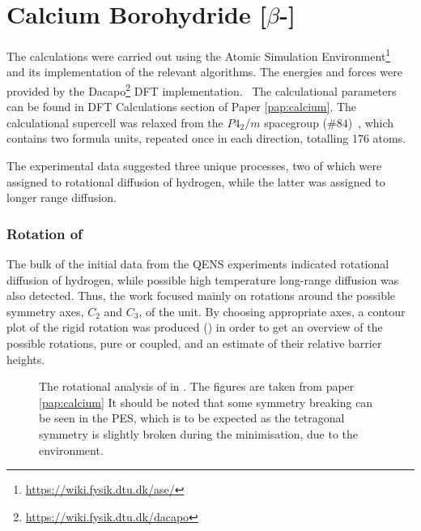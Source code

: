 \section{Calcium Borohydride [$\beta$-]}
\label{sec:borohydrides-calcium}

The calculations were carried out using the Atomic Simulation Environment\footnote{\url{https://wiki.fysik.dtu.dk/ase/}}~\cite{ase-2002} and its implementation of the relevant algorithms.
The energies and forces were provided by the Dacapo\footnote{\url{https://wiki.fysik.dtu.dk/dacapo}} DFT implementation.~\cite{dacapo-1999}
The calculational parameters can be found in DFT Calculations section of Paper \ref{pap:calcium}.
The calculational supercell was relaxed from the $P4_2/m$ spacegroup ($\#84$)~\cite{cabh42-structure-p42m}, which contains two formula units, repeated once in each direction, totalling 176 atoms.

The experimental data suggested three unique processes, two of which were assigned to rotational diffusion of hydrogen, while the latter was assigned to longer range diffusion.

\subsubsection{Rotation of }
The bulk of the initial data from the QENS experiments indicated rotational diffusion of hydrogen, while possible high temperature long-range diffusion was also detected.
Thus, the work focused mainly on rotations around the possible symmetry axes, $C_2$ and $C_3$, of the  unit.
By choosing appropriate axes, a contour plot of the rigid rotation was produced () in order to get an overview of the possible rotations, pure or coupled, and an estimate of their relative barrier heights.

\begin{figure}[h]
\begin{center}
    \parbox{0.85\linewidth}{
      \caption{The rotational analysis of  in .
      The figures are taken from paper \ref{pap:calcium}
It should be noted that some symmetry breaking can be seen in the PES, which is to be expected as the tetragonal symmetry is slightly broken during the minimisation, due to the environment.
      }
      \label{fig:ca-rotational}
    }
\end{center}
\end{figure}

